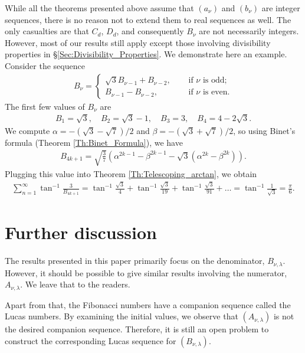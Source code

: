 \documentclass[12pt]{article}
\theoremstyle{plain}
\theoremstyle{definition}
\theoremstyle{remark}
\begin{document}
While all the theorems presented above assume that $ (a_\nu) $ and $ (b_\nu) $ are integer sequences, there is no reason not to extend them to real sequences as well. The only casualties are that $ C_d $, $ D_d $, and consequently $ B_\nu $ are not necessarily integers. However, most of our results still apply except those involving divisibility properties in \S \ref{Sec:Divisibility_Properties}. We demonstrate here an example. Consider the sequence
\begin{align*}
	B_\nu = \begin{cases} \sqrt{3} B_{\nu - 1} + B_{\nu - 2}, \quad &\text{ if } \nu \text{ is odd}; \\ B_{\nu - 1} - B_{\nu - 2}, \quad &\text{ if } \nu \text{ is even}. \end{cases}
\end{align*}
The first few values of $ B_\nu $ are
\begin{align*}
	B_1 = \sqrt{3}, \quad B_2 = \sqrt{3} - 1, \quad B_3 = 3, \quad B_4 = 4 - 2\sqrt{3}.	
\end{align*}
We compute $ \alpha = -(\sqrt{3} - \sqrt{7})/2  $ and $ \beta = -(\sqrt{3} + \sqrt{7})/2 $, so using Binet's formula (Theorem \ref{Th:Binet_Formula}), we have
\begin{align*}
	B_{4k + 1} = \sqrt{\frac{3}{7}} (\alpha^{2k - 1} - \beta^{2k - 1}  - \sqrt{3} (\alpha^{2k} - \beta^{2k})).
\end{align*}
Plugging this value into Theorem \ref{Th:Telescoping_arctan}, we obtain
\begin{align*}
	\sum_{n = 1}^\infty \tan^{-1} \frac{3}{B_{4k + 1}} = \tan^{-1} \frac{\sqrt{3}}{4} + \tan^{-1} \frac{\sqrt{3}}{19} + \tan^{-1} \frac{\sqrt{3}}{91} + \ldots = \tan^{-1} \frac{1}{\sqrt{3}} = \frac{\pi}{6}.
\end{align*} 

\section{Further discussion}

The results presented in this paper primarily focus on the denominator, $ B_{\nu, \lambda} $. However, it should be possible to give similar results involving the numerator, $ A_{\nu, \lambda} $. We leave that to the readers.

Apart from that, the Fibonacci numbers have a companion sequence called the Lucas numbers. By examining the initial values, we observe that $ (A_{\nu, \lambda}) $ is not the desired companion sequence. Therefore, it is still an open problem to construct the corresponding Lucas sequence for $ (B_{\nu, \lambda}) $. 
\end{document}

